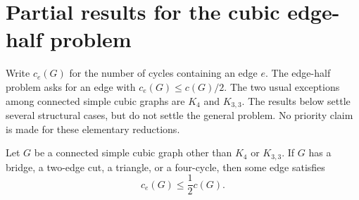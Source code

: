 \section{Partial results for the cubic edge-half problem}
\label{sec:cubic-edge-frequency}

Write $c_e(G)$ for the number of cycles containing an edge $e$.
The edge-half problem asks for an edge with $c_e(G)\le c(G)/2$.
The two usual exceptions among connected simple cubic graphs are $K_4$ and $K_{3,3}$.
The results below settle several structural cases, but do not settle the general problem.
No priority claim is made for these elementary reductions.

\begin{proposition}\label{prop:cubic-small-structures}
Let $G$ be a connected simple cubic graph other than $K_4$ or $K_{3,3}$.
If $G$ has a bridge, a two-edge cut, a triangle, or a four-cycle, then some edge satisfies
\[
 c_e(G)\le\frac12c(G).
\]
\end{proposition}

